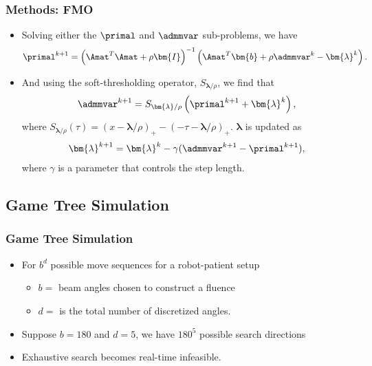 \begin{frame}
\frametitle{Methods: FMO}
\begin{itemize}
	\item Solving either the $\primal$ and $\admmvar$ sub-problems, we have
	\begin{align}
	\primal^{k+1} = \left(\Amat^T\Amat + \rho \bm{I}\right)^{-1}\left(\Amat^T\bm{b}+ \rho \admmvar^k - \bm{\lambda}^k\right).
	\label{eq:admm_xupdate}
	\end{align}
	\item And using the soft-thresholding operator, $S_{\bm{\lambda}/\rho}$, we find that
	\begin{align}
	\admmvar^{k+1} = S_{\bm{\lambda}/\rho}\left(\primal^{k+1} + \bm{\lambda}^k \right),
	\end{align}
	where $S_{\bm{\lambda}/\rho}(\tau) = (x - \bm{\lambda}/\rho)_+ - (-\tau - \bm{\lambda}/\rho)_+$.  $\bm{\lambda}$ is updated as
	\begin{align}
	\bm{\lambda}^{k+1} = \bm{\lambda}^k - \gamma (\admmvar^{k+1} - \primal^{k+1}),
	\end{align}
	where $\gamma$ is a parameter that controls the step length.
\end{itemize}
\end{frame}


\subsection{Game Tree Simulation}
\begin{frame}
	\frametitle{Game Tree Simulation}
	\begin{itemize}
		\item For $b^d$ possible move sequences for a robot-patient setup 
		\begin{itemize}
			\item $b = $ beam angles chosen to construct a fluence 
			\item $d = $ is the total number of discretized angles.
		\end{itemize}
	\item  Suppose $b=180$ and $d = 5$, we have $180^{5}$ possible search directions
	\item Exhaustive search becomes real-time infeasible.
	\end{itemize}%
\end{frame}


